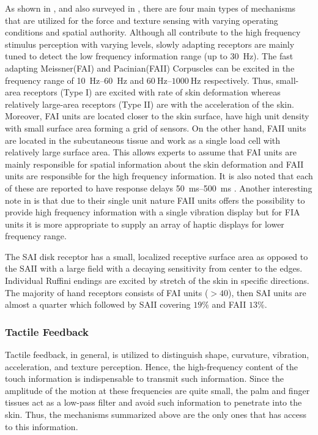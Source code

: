 As shown in , and also surveyed in \cite{kontarinis}, there are four main types of mechanisms that are utilized for the force and texture sensing with varying operating conditions and spatial authority. Although all contribute to the high frequency stimulus perception with varying levels, slowly adapting receptors are mainly tuned to detect the low frequency information range (up to \SI{30}{\hertz}). The fast adapting Meissner(FAI) and Pacinian(FAII) Corpuscles can be excited in the frequency range of \SIrange{10}{60}{\hertz} and $\SIrange{60}{1000}{\hertz}$ respectively. Thus, small-area receptors (Type I) are excited with rate of skin deformation whereas relatively large-area receptors (Type II) are with the acceleration of the skin. Moreover, FAI units are located closer to the skin surface, have high unit density with small surface area forming a grid of sensors. On the other hand, FAII units are located in the subcutaneous tissue and work as a single load cell with relatively large surface area. This allows experts to assume that FAI units are mainly responsible for spatial information about the skin deformation and FAII units are responsible for the high frequency information. It is also noted that each of these are reported to have response delays \SIrange{50}{500}{\milli\second} \cite{idareview}. Another interesting note in \cite{kontarinis} is that due to their single unit nature FAII units offers the possibility to provide high frequency information with a single vibration display but for FIA units it is more appropriate to supply an array of haptic displays for lower frequency range.  

The SAI disk receptor has a small, localized receptive surface area as opposed to the SAII with a large field with a decaying sensitivity from center to the edges. Individual Ruffini endings are excited by stretch of the skin in specific directions. The majority of hand receptors consists of FAI units ($>40$), then SAI units are almost a quarter which followed by SAII covering $19\%$ and FAII $13\%$. 







\subsubsection{Tactile Feedback}

Tactile feedback, in general, is utilized to distinguish shape, curvature, vibration, acceleration, and texture perception. Hence, the high-frequency content of the touch information is indispensable to transmit such information. Since the amplitude of the motion at these frequencies are quite small, the palm and finger tissues act as a low-pass filter and avoid such information to penetrate into the skin. Thus, the mechanisms summarized above are the only ones that has access to this information.


